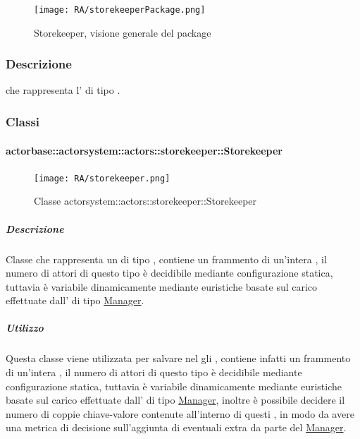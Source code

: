 \documentclass{scalatekids-article}
\begin{document}
\begin{figure}[H]
  \begin{center}
    \texttt{[image: RA/storekeeperPackage.png]}
    \caption{Storekeeper, visione generale del package}
  \end{center}
\end{figure}

\subsubsection{Descrizione}
 che rappresenta l' di tipo .

\subsubsection{Classi}

\paragraph{actorbase::actorsystem::actors::storekeeper::Storekeeper}
\label{sec:actorbase::actorsystem::actors::storekeeper::Storekeeper}

\begin{figure}[H]
  \begin{center}
    \texttt{[image: RA/storekeeper.png]}
    \caption{Classe actorsystem::actors::storekeeper::Storekeeper}
  \end{center}
\end{figure}

\subparagraph{Descrizione}
Classe che rappresenta un  di tipo , contiene
un frammento di un'intera , il numero di attori di questo tipo
è decidibile mediante configurazione statica, tuttavia è variabile dinamicamente
mediante euristiche basate sul carico effettuate dall' di tipo
\hyperref[sec:actorbase::actorsystem::actors::manager::Manager]{Manager}.

\subparagraph{Utilizzo}
Questa classe viene utilizzata per salvare nel  gli
, contiene infatti un frammento di un'intera , il
numero di attori di questo tipo è decidibile mediante configurazione statica,
tuttavia è variabile dinamicamente mediante euristiche basate sul carico
effettuate dall' di tipo
\hyperref[sec:actorbase::actorsytem::actors::manager::Manager]{Manager}, inoltre
è possibile decidere il numero di coppie chiave-valore contenute all'interno di
questi , in modo da avere una metrica di decisione sull'aggiunta
di eventuali  extra da parte del
\hyperref[sec:actorbase::actorsytem::actors::manager::Manager]{Manager}.
\end{document}

